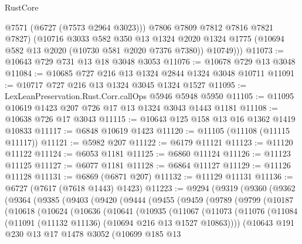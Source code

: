 \begin{lexlean}{RustCore}
\begin{coremodule}
            @7571
            (@6727 (@7573 @2964 @3023)))
          @7806
          @7809
          @7812
          @7816
          @7821
          @7827)
        (@10716
          @3033
          @582
          @350
          @13
          @1324
          @2020
          @1324
          @1775
          (@10694 @582 @13 @2020 (@10730 @581 @2020 @7376 @7380))
          @10749)))
@11073 := @10643 @729 @731 @13 @18 @3048 @3053
@11076 := @10678 @729 @13 @3048
@11084 := @10685 @727 @216 @13 @1324 @2844 @1324 @3048 @10711
@11091 := @10717 @727 @216 @13 @1324 @3045 @1324 @1527
@11095 := LexLeanPreservation.Rust.Corr.callOps @5946 @5948 @5950
@11105 := @11095 @10619 @1423 @207 @726 @17 @13 @1324 @3043 @1443 @1181
@11108 := @10638 @726 @17 @3043
@11115 := @10643 @125 @158 @13 @16 @1362 @1419 @10833
@11117 := @6848 @10619 @1423
@11120 := @11105 (@11108 (@11115 @11117))
@11121 := @5982 @207
@11122 := @6179 @11121
@11123 := @11120 @11122
@11124 := @6053 @1181
@11125 := @6860 @11124
@11126 := @11123 @11125
@11127 := @6077 @1181
@11128 := @6864 @11127
@11129 := @11126 @11128
@11131 := @6869 (@6871 @207)
@11132 := @11129 @11131
@11136 := @6727 (@7617 (@7618 @1443) @1423)
@11223 := @9294
    (@9319
      (@9360
        (@9362
          (@9364
            (@9385
              (@9403
                (@9420
                  (@9444
                    (@9455
                      (@9459
                        (@9789
                          (@9799
                            (@10187
                              (@10618
                                (@10624
                                  (@10636
                                    (@10641
                                      (@10935
                                        (@11067
                                          (@11073
                                            (@11076
                                              (@11084
                                                (@11091
                                                  (@11132 @11136)
                                                  (@10694 @216 @13 @1527 @10863))))
                                            (@10643
                                              @191
                                              @230
                                              @13
                                              @17
                                              @1478
                                              @3052
                                              (@10699
                                                @185
                                                @13

\end{coremodule}
\end{lexlean}
